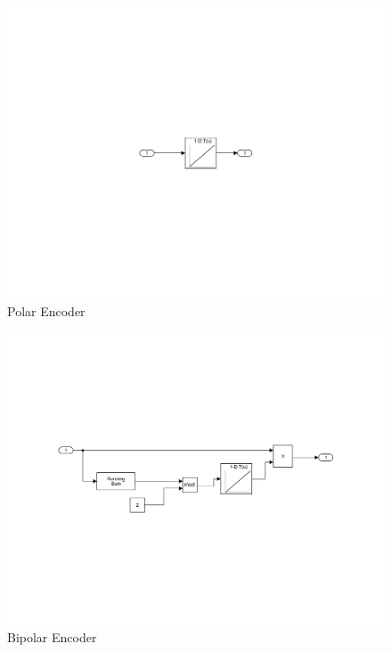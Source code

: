 \documentclass{article}
\begin{document}
\begin{figure}[H]
  \includegraphics[width = \linewidth]{Polar_Encoder.jpg}
  \caption{Polar Encoder}
  \label{fig:Polar-System}
\end{figure}
\begin{figure}[H]
  \includegraphics[width = \linewidth]{Bipolar_Encoder.jpg}
  \caption{Bipolar Encoder}
  \label{fig:Bipolar-System}
\end{figure}
\end{document}
